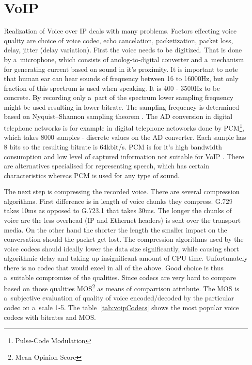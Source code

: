 \section{VoIP}
Realization of Voice over IP deals with many problems. Factors effecting voice quality are choice of voice codec, echo cancelation, packetization, packet loss, delay, jitter (delay variation). First the voice needs to be digitized. That is done by a~microphone, which consists of anolog-to-digital converter and a~mechanism for generating current based on sound in it's proximity. It is important to note that human ear can hear sounds of frequency between 16 to 16000Hz, but only fraction of this spectrum is used when speaking. It is 400 - 3500Hz to be concrete. By recording only a~part of the spectrum lower sampling frequency might be used resulting in lower bitrate. The sampling frequency is determined based on Nyquist–Shannon sampling theorem \cite{sampling-theorem}. The AD conversion in digital telephone networks is for example in digital telephone netoworks done by PCM\footnote{Pulse-Code Modulation}, which takes 8000 samples - discrete values on the AD converter. Each sample has 8 bits so the resulting bitrate is 64kbit/s. PCM is for it's high bandwidth consumption and low level of captured information not suitable for VoIP \cite{digitalSpeechBook}. There are alternatives specialised for representing speech, which has certain characteristics whereas PCM is used for any type of sound.  
 
The next step is compressing the recorded voice. There are several compression algorithms. First difference is in length of voice chunks they compress. G.729 takes 10ms as opposed to G.723.1 that takes 30ms. The longer the chunks of voice are the less overhead (IP and Ethernet headers) is sent over the transport media. On the other hand the shorter the length the smaller impact on the conversation should the packet get lost. The compression algorithms used by the voice codecs should ideally lower the data size significantly, while causing short algorithmic delay and taking up insignificant amount of CPU time. Unfortunately there is no codec that would excel in all of the above. Good choice is thus a~suitable compromise of the qualities. Since codecs are very hard to compare based on those qualities MOS\footnote{Mean Opinion Score} as means of comparrison attribute. The MOS is a~subjective evaluation of quality of voice encoded/decoded by the particular codec on a~scale 1-5. The table~\ref{tab:voipCodecs} shows the most popular voice codecs with bitrates and MOS. 

